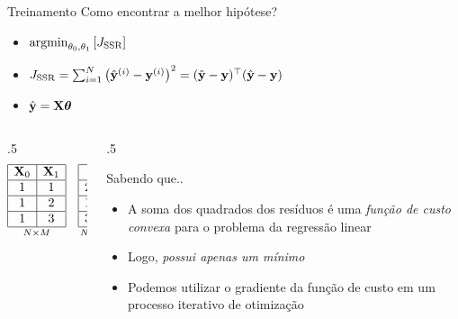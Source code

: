 \documentclass[aspectratio=169,xcolor=dvipsnames]{beamer}
\begin{document}
\begin{frame}{Treinamento}
Como encontrar a melhor hipótese?
\begin{itemize}
    \item\(\operatorname*{argmin}_{\theta_0,\theta_1}\left[J_{\text{SSR}}\right]\)
    \item \(J_{\text{SSR}}=\sum_{i=1}^{N}\left(\hat{\mathbf{y}}^{(i)} - \mathbf{y}^{(i)}\right)^2=(\hat{\mathbf{y}} - \mathbf{y})^\top(\hat{\mathbf{y}} - \mathbf{y})\)
    \item \(\hat{\mathbf{y}}=\mathbf{X}\bm{\theta}\)
\end{itemize}
\begin{columns}
    \begin{column}{.5\textwidth}
    \[
    \underset{N\times M}{
    \begin{array}{|c|c|}
      \hline
        \mathbf{X}_0 &  \mathbf{X}_1  \\
        \hline
        1 & 1   \\
        \hline
        1 & 2   \\
        \hline
        1 & 3   \\
        \hline
      \end{array}
      }
      \quad
      \underset{N\times 1}{
      \begin{array}{|c|}
      \hline
        \mathbf{y}  \\
        \hline
        20   \\
        \hline
        10   \\
        \hline
        30   \\
        \hline
      \end{array}}
      \quad
      \underset{M\times 1}{
      \begin{array}{|c|}
      \hline
      \bm{{\theta}} \\
        \hline
        \theta_0  \\
        \hline
        \theta_1  \\
        \hline
      \end{array}}
    \]    
    \end{column}
    \begin{column}{.5\textwidth} 
        \begin{block}{Sabendo que..}
            \begin{itemize}
                \item A soma dos quadrados dos resíduos é uma \textit{função de custo convexa} para o problema da regressão linear
                \item Logo, \textit{possui apenas um mínimo}
                \item Podemos utilizar o gradiente da função de custo em um processo iterativo de otimização
            \end{itemize}
        \end{block}

    \end{column}
\end{columns}
\end{frame}
\end{document}
